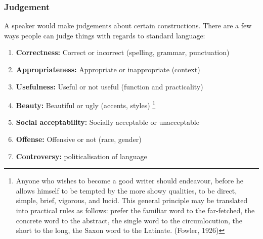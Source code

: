 \documentclass[../main.tex]{subfiles}
\begin{document}
        \subsubsection{Judgement}
        A speaker would make judgements about certain constructions. There are a few ways people can judge things with regards to standard language:
        \begin{enumerate}
            \item \textbf{Correctness:} Correct or incorrect (spelling, grammar, punctuation)
            \item \textbf{Appropriateness:} Appropriate or inappropriate (context)
            \item \textbf{Usefulness:} Useful or not useful (function and practicality)
            \item \textbf{Beauty:} Beautiful or ugly (accents, styles) \footnote{Anyone who wishes to become a good writer should endeavour, before he allows himself to be tempted by the more showy qualities, to be direct, simple, brief, vigorous, and lucid. This general principle may be translated into practical rules as follows: prefer the familiar word to the far-fetched, the concrete word to the abstract, the single word to the circumlocution, the short to the long, the Saxon word to the Latinate. (Fowler, 1926)}
            \item \textbf{Social acceptability:} Socially acceptable or unacceptable
            \item \textbf{Offense:} Offensive or not (race, gender)
            \item \textbf{Controversy:} politicalisation of language
        \end{enumerate}


\end{document}
